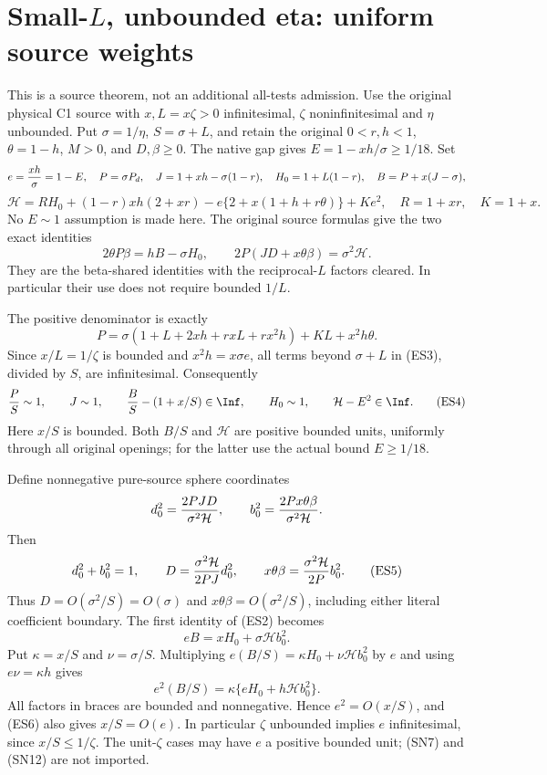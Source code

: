 \section{Small-$L$, unbounded eta: uniform source weights}
\label{sec:r13-small-L-eta-large-bounds}

This is a source theorem, not an additional all-tests admission.
Use the original physical C1 source with $x,L=x\zeta>0$
infinitesimal, $\zeta$ noninfinitesimal and $\eta$ unbounded.
Put $\sigma=1/\eta$, $S=\sigma+L$, and retain the original
$0<r,h<1$, $\theta=1-h$, $M>0$, and $D,\beta\ge0$.
The native gap gives $E=1-xh/\sigma\ge1/18$. Set
\[
 e={xh\over\sigma}=1-E,\quad
 P=\sigma P_d,\quad J=1+xh-\sigma(1-r),\quad
 H_0=1+L(1-r),\quad B=P+x(J-\sigma),
\]
\[
 \mathcal H=R H_0+(1-r)xh(2+xr)
 -e\{2+x(1+h+r\theta)\}+Ke^2,
 \quad R=1+xr,\quad K=1+x.                           \tag{ES1}
\]
No $E\sim1$ assumption is made here. The original source formulas
give the two exact identities
\[
 2\theta P\beta=hB-\sigma H_0,\qquad
 2P(JD+x\theta\beta)=\sigma^2\mathcal H.             \tag{ES2}
\]
They are the beta-shared identities with the reciprocal-$L$ factors
cleared. In particular their use does not require bounded $1/L$.

The positive denominator is exactly
\[
 P=\sigma(1+L+2xh+rxL+rx^2h)+KL+x^2h\theta.
                                                               \tag{ES3}
\]
Since $x/L=1/\zeta$ is bounded and $x^2h=x\sigma e$,
all terms beyond $\sigma+L$ in (ES3), divided by $S$, are
infinitesimal. Consequently
\[
 {P\over S}\sim1,\qquad J\sim1,\qquad
 {B\over S}-(1+x/S)\in\Inf,\qquad
 H_0\sim1,\qquad \mathcal H-E^2\in\Inf.             \tag{ES4}
\]
Here $x/S$ is bounded. Both $B/S$ and $\mathcal H$ are
positive bounded units, uniformly through all original openings;
for the latter use the actual bound $E\ge1/18$.

Define nonnegative pure-source sphere coordinates
\[
 d_0^2={2PJD\over\sigma^2\mathcal H},\qquad
 b_0^2={2Px\theta\beta\over\sigma^2\mathcal H}.
\]
Then
\[
 d_0^2+b_0^2=1,\qquad
 D={\sigma^2\mathcal H\over2PJ}d_0^2,\qquad
 x\theta\beta={\sigma^2\mathcal H\over2P}b_0^2.
                                                               \tag{ES5}
\]
Thus $D=O(\sigma^2/S)=O(\sigma)$ and
$x\theta\beta=O(\sigma^2/S)$, including either literal coefficient
boundary. The first identity of (ES2) becomes
\[
 eB=xH_0+\sigma\mathcal H b_0^2.                     \tag{ES6}
\]
Put $\kappa=x/S$ and $\nu=\sigma/S$. Multiplying
$e(B/S)=\kappa H_0+\nu\mathcal H b_0^2$ by $e$ and using
$e\nu=\kappa h$ gives
\[
 e^2(B/S)=\kappa\{eH_0+h\mathcal H b_0^2\}.
                                                               \tag{ES7}
\]
All factors in braces are bounded and nonnegative. Hence
$e^2=O(x/S)$, and (ES6) also gives $x/S=O(e)$.
In particular $\zeta$ unbounded implies $e$ infinitesimal,
since $x/S\le1/\zeta$. The unit-$\zeta$ cases may have
$e$ a positive bounded unit; (SN7) and (SN12) are not imported.

